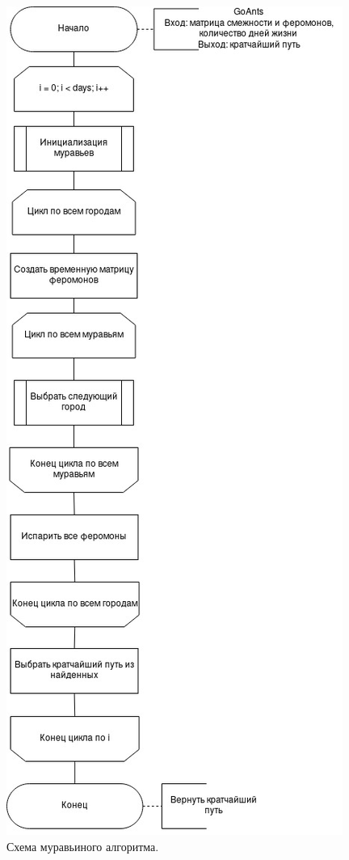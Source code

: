 \documentclass[12pt]{report}
\begin{document}
\begin{figure}[H]
		\centering
		\includegraphics[scale=0.6]{ant.jpg}
		\caption{Схема муравьиного алгоритма.}
		\label{fig:ant}
\end{figure}
	
\end{document}
